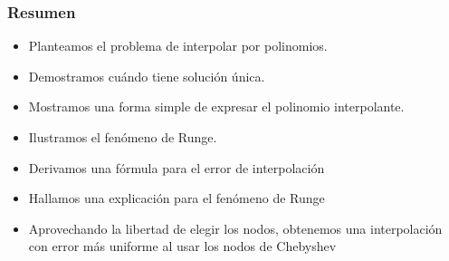 \documentclass[english, spanish, fleqn,%
hyperref = {colorlinks, urlcolor = blue}%
]{beamer}
\begin{document}
\begin{frame}
  \setcounter{beamerpauses}{2}
  \frametitle{Resumen}

  \begin{itemize}
  \item
    Planteamos el problema de interpolar por polinomios.
  \item
    Demostramos cuándo tiene solución única.
  \item
    Mostramos una forma simple de expresar el polinomio interpolante.
  \item
    Ilustramos el fenómeno de Runge.
  \item
    Derivamos una fórmula para el error de interpolación
  \item
    Hallamos una explicación para el fenómeno de Runge
  \item
    Aprovechando la libertad de elegir los nodos,
    obtenemos una interpolación con error más uniforme
    al usar los nodos de Chebyshev
  \end{itemize}
\end{frame}
\end{document}
